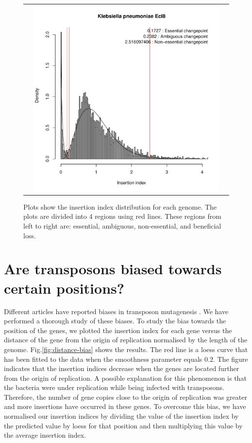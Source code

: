 \documentclass[12pt,letterpaper]{article}
\begin{document}
\begin{figure}
\begin{tabular}{c c c}
&\includegraphics[page=13, scale=0.25]{essentiality.pdf}&\\
\end{tabular}
\caption{Plots show the insertion index distribution for each genome. The plots are divided into 4 regions using red lines. These regions from left to right are: essential, ambiguous, non-essential, and beneficial loss.}
\label{fig:iidist-species}
\end{figure}

\section{Are transposons biased towards certain positions?}
Different articles have reported biases in transposon mutagenesis \cite{barquist_comparison_2013, rubin_essential_2015, kimura_nucleoid_2016}. We have performed a thorough study of these biases. To study the bias towards the position of the genes, we plotted the insertion index for each gene versus the distance of the gene from the origin of replication normalised by the length of the genome. Fig.\@ \ref{fig:distance-bias} shows the results. The red line is a loess curve that has been fitted to the data when the smoothness parameter equals $0.2$. The figure indicates that the insertion indices decrease when the genes are located further from the origin of replication. A possible explanation for this phenomenon is that the bacteria were under replication while being infected with transposons. Therefore, the number of gene copies close to the origin of replication was greater and more insertions have occurred in these genes. To overcome this bias, we have normalised our insertion indices by dividing the value of the insertion index by the predicted value by loess for that position and then multiplying this value by the average insertion index.
\end{document}
